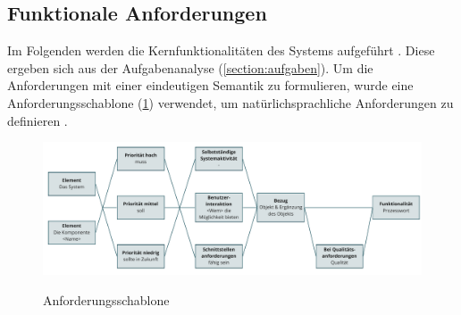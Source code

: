 \subsection{Funktionale Anforderungen}
\label{section:funktionale}
Im Folgenden werden die Kernfunktionalitäten des Systems aufgeführt \cite{balzert2009}. Diese
ergeben sich aus der Aufgabenanalyse (\ref{section:aufgaben}). Um die Anforderungen mit einer
eindeutigen Semantik zu formulieren, wurde eine Anforderungsschablone (\ref{fig:schablone})
verwendet, um natürlichsprachliche Anforderungen zu definieren \cite{balzert2009}.

\begin{figure}[h]
        \centering
        \includegraphics[scale=0.45]{Bilder/anforderungsschablone.pdf}
        \label{fig:schablone}
        \caption[Anforderungsschablone]{Anforderungsschablone \cite{balzert2009}}
\end{figure}


